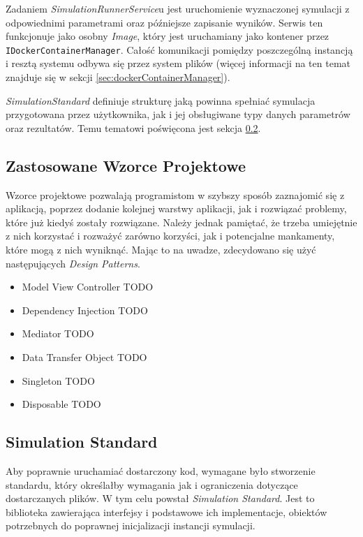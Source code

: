 \par Zadaniem \emph{SimulationRunnerService}u jest uruchomienie wyznaczonej symulacji z odpowiednimi parametrami oraz późniejsze zapisanie wyników. Serwis ten funkcjonuje jako osobny \emph{\docker Image}, który jest uruchamiany jako kontener przez \texttt{IDockerContainerManager}. Całość komunikacji pomiędzy poszczególną instancją i resztą systemu odbywa się przez system plików (więcej informacji na ten temat znajduje się w sekcji \ref{sec:dockerContainerManager}).

\par \emph{SimulationStandard} definiuje strukturę jaką powinna spełniać symulacja przygotowana przez użytkownika, jak i jej obsługiwane typy danych parametrów oraz rezultatów. Temu tematowi poświęcona jest sekcja \ref{sec:simulationStandard}.

\subsection{Zastosowane Wzorce Projektowe}

\par Wzorce projektowe pozwalają programistom w szybszy sposób zaznajomić się z aplikacją, poprzez dodanie kolejnej warstwy aplikacji, jak i rozwiązać problemy, które już kiedyś zostały rozwiązane. Należy jednak pamiętać, że trzeba umiejętnie z nich korzystać i rozważyć zarówno korzyści, jak i potencjalne mankamenty, które mogą z nich wyniknąć. Mając to na uwadze, zdecydowano się użyć następujących \emph{Design Patterns}.

\begin{itemize}
	\item Model View Controller TODO %
	\item Dependency Injection TODO %
	\item Mediator TODO %
	\item Data Transfer Object TODO %
	\item Singleton TODO %
	\item Disposable TODO %
\end{itemize}

\subsection{Simulation Standard}
\label{sec:simulationStandard}

\par Aby poprawnie uruchamiać dostarczony kod, wymagane było stworzenie standardu, który określałby wymagania jak i ograniczenia dotyczące dostarczanych plików. W tym celu powstał \emph{Simulation Standard}. Jest to biblioteka zawierająca interfejsy i podstawowe ich implementacje, obiektów potrzebnych do poprawnej inicjalizacji instancji symulacji.

